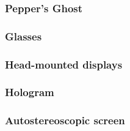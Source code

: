 \subsubsection{Pepper's Ghost}
\subsubsection{Glasses}
\subsubsection{Head-mounted displays}
\subsubsection{Hologram}
\subsubsection{Autostereoscopic screen}
